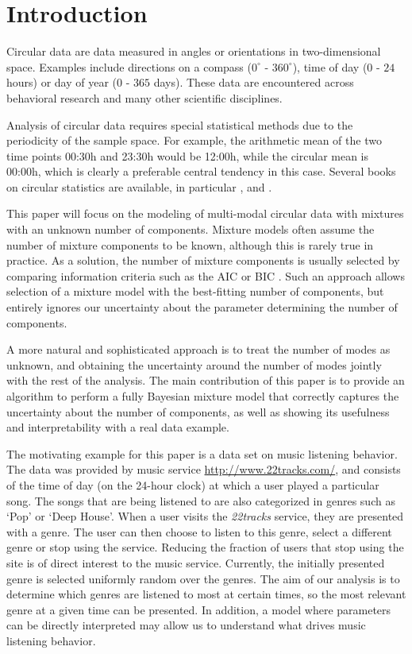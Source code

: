 \section{Introduction}
\label{introduction}
Circular data are data measured in angles or orientations in two-dimensional space. Examples include directions on a compass ($0^\circ$ - $360^\circ$), time of day ($0$ - $24$ hours) or day of year ($0$ - $365$ days). These data are encountered across behavioral research \citep{Mechsner:2001ff, Gurtman:2009jz} and many other scientific disciplines.

Analysis of circular data requires special statistical methods due to the periodicity of the sample space. For example, the arithmetic mean of the two time points 00:30h and 23:30h would be 12:00h, while the circular mean is 00:00h, which is clearly a preferable central tendency in this case. Several books on circular statistics are available, in particular \citet{pewsey2013circular}, \citet{Mardia2009} and \citet{fisher1995statistical}. 

This paper will focus on the modeling of multi-modal circular data with mixtures with an unknown number of components.  Mixture models often assume the number of mixture components to be known, although this is rarely true in practice. As a solution, the number of mixture components is usually selected by comparing information criteria such as the AIC \citep{Akaike:1974ta} or BIC \citep{Schwarz:1978kf}. Such an approach allows selection of a mixture model with the best-fitting number of components, but entirely ignores our uncertainty about the parameter determining the number of components. 

A more natural and sophisticated approach is to treat the number of modes as unknown, and obtaining the uncertainty around the number of modes jointly with the rest of the analysis. The main contribution of this paper is to provide an algorithm to perform a fully Bayesian mixture model that correctly captures the uncertainty about the number of components, as well as showing its usefulness and interpretability with a real data example.

The motivating example for this paper is a data set on music listening behavior. The data was provided by music service \href{22tracks}{\url{http://www.22tracks.com/}}, and consists of the time of day (on the 24-hour clock) at which a user played a particular song. The songs that are being listened to are also categorized in genres such as `Pop' or `Deep House'. When a user visits the \textit{22tracks} service, they are presented with a genre. The user can then choose to listen to this genre, select a different genre or stop using the service. Reducing the fraction of users that stop using the site is of direct interest to the music service. Currently, the initially presented genre is selected uniformly random over the genres. The aim of our analysis is to determine which genres are listened to most at certain times, so the most relevant genre at a given time can be presented. In addition, a model where parameters can be directly interpreted may allow us to understand what drives music listening behavior.


